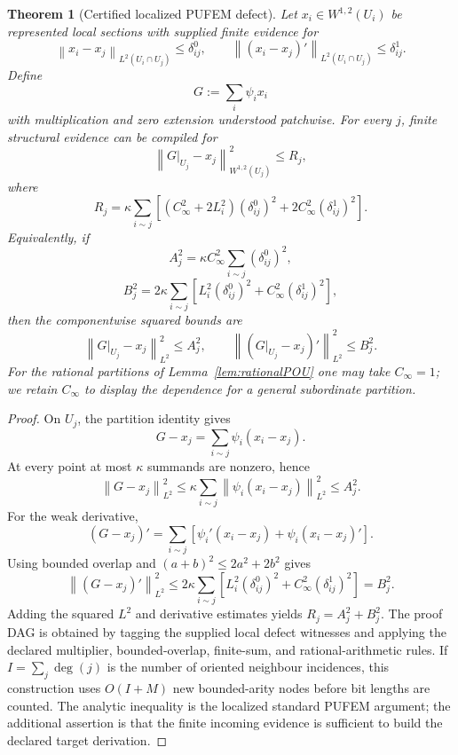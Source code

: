 \documentclass[10pt,a4paper]{amsart}
\newtheorem{theorem}{Theorem}
\newcommand{\norm}[1]{\left\lVert #1 \right\rVert}
\begin{document}
\begin{theorem}[Certified localized PUFEM defect]\label{thm:pufemdefect}
Let $x_i\in W^{1,2}(U_i)$ be represented local sections with supplied finite evidence for
\[
 \norm{x_i-x_j}_{L^2(U_i\cap U_j)}\le\delta^0_{ij},
 \qquad
 \norm{(x_i-x_j)'}_{L^2(U_i\cap U_j)}\le\delta^1_{ij}.
\]
Define
\[
 G:=\sum_i\psi_i x_i
\]
with multiplication and zero extension understood patchwise.  For every $j$, finite
structural evidence can be compiled for
\[
 \norm{G|_{U_j}-x_j}_{W^{1,2}(U_j)}^2\le R_j,
\]
where
\[
 R_j
 =\kappa\sum_{i\sim j}
 \left[(C_\infty^2+2L_i^2)(\delta^0_{ij})^2
       +2C_\infty^2(\delta^1_{ij})^2\right].
\]
Equivalently, if
\[
 A_j^2=\kappa C_\infty^2\sum_{i\sim j}(\delta^0_{ij})^2,
\]
\[
 B_j^2=2\kappa\sum_{i\sim j}
 \left[L_i^2(\delta^0_{ij})^2+C_\infty^2(\delta^1_{ij})^2\right],
\]
then the componentwise squared bounds are
\[
 \norm{G|_{U_j}-x_j}_{L^2}^2\le A_j^2,
 \qquad
 \norm{(G|_{U_j}-x_j)'}_{L^2}^2\le B_j^2.
\]
For the rational partitions of Lemma~\ref{lem:rationalPOU} one may take $C_\infty=1$;
we retain $C_\infty$ to display the dependence for a general subordinate partition.
\end{theorem}

\begin{proof}
On $U_j$, the partition identity gives
\[
 G-x_j=\sum_{i\sim j}\psi_i(x_i-x_j).
\]
At every point at most $\kappa$ summands are nonzero, hence
\[
 \norm{G-x_j}_{L^2}^2
 \le\kappa\sum_{i\sim j}
       \norm{\psi_i(x_i-x_j)}_{L^2}^2
 \le A_j^2.
\]
For the weak derivative,
\[
 (G-x_j)'=\sum_{i\sim j}
 \left[\psi_i'(x_i-x_j)+\psi_i(x_i-x_j)'\right].
\]
Using bounded overlap and $(a+b)^2\le2a^2+2b^2$ gives
\[
 \norm{(G-x_j)'}_{L^2}^2
 \le2\kappa\sum_{i\sim j}
 \left[L_i^2(\delta^0_{ij})^2
 +C_\infty^2(\delta^1_{ij})^2\right]=B_j^2.
\]
Adding the squared $L^2$ and derivative estimates yields $R_j=A_j^2+B_j^2$.
The proof DAG is obtained by tagging the supplied local defect witnesses and applying the
declared multiplier, bounded-overlap, finite-sum, and rational-arithmetic rules.  If
$I=\sum_j\deg(j)$ is the number of oriented neighbour incidences, this construction uses
$O(I+M)$ new bounded-arity nodes before bit lengths are counted.  The
analytic inequality is the localized standard PUFEM argument; the additional assertion is
that the finite incoming evidence is sufficient to build the declared target derivation.
\end{proof}
\end{document}
